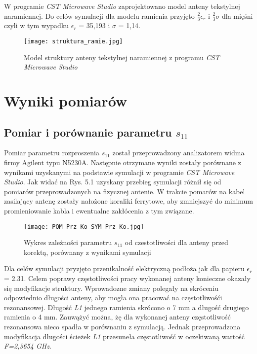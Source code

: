 W programie \emph{CST Microwave Studio} zaprojektowano  model anteny tekstylnej naramiennej. Do celów symulacji dla modelu ramienia przyjęto $\frac{2}{3}\epsilon_{r}$ i $\frac{2}{3}\sigma$ dla mięśni czyli w tym wypadku $\epsilon_{r}$ = 35,193 i $\sigma$ = 1,14.

\begin{figure}[h!]
	\centering
	    \texttt{[image: struktura\_ramie.jpg]}
	    \caption{Model struktury anteny tekstylnej naramiennej z programu \emph{CST Microwave Studio}}
\end{figure}


\chapter{Wyniki pomiarów}

\section{Pomiar i porównanie parametru $s_{11}$}

Pomiar parametru rozproszenia $s_{11}$ został przeprowadzony analizatorem widma firmy Agilent typu N5230A. Następnie otrzymane wyniki zostały porównane z wynikami uzyskanymi na podstawie symulacji w programie \emph{CST Microwave Studio}. Jak widać na Rys. 5.1 uzyskany przebieg symulacji różnił się od pomiarów przeprowadzonych na fizycznej antenie. W trakcie pomarów na kabel zasilający antenę zostały nałożone koraliki ferrytowe, aby zmniejszyć do minimum promieniowanie kabla i ewentualne zakłócenia z tym związane. 


\begin{figure}[h!]
\centering
	\texttt{[image: POM\_Prz\_Ko\_SYM\_Prz\_Ko.jpg]}
	\caption{Wykres zależności parametru $s_{11}$ od czestotliwości dla anteny przed korektą, porównany z wynikami symulacji}
\end{figure}


\newpage
Dla celów symulacji pryzjęto przenikalność elektryczną podłoża jak dla papieru $\epsilon_{r}$ = 2.31. Celem poprawy częstotliwości pracy wykonanej anteny konieczne okazały się modyfikacje struktury. Wprowadozne zmiany polegały na skróceniu odpowiednio długości anteny, aby mogła ona pracować na częstotliwośći rezonansowej. Długość \emph{L1} jednego ramienia skrócono o 7 mm a długość drugiego ramienia o 4 mm. Zauwążyć można, żę dla wykonanej anteny częstotliwość rezonansowa nieco spadła w porównaniu z symulacją. Jednak przeprowadzona modyfikacja długości ścieżek \emph{L1} przesuneła częstotliwość w oczekiwaną wartość \emph{F=2,3654 GHz}.   

